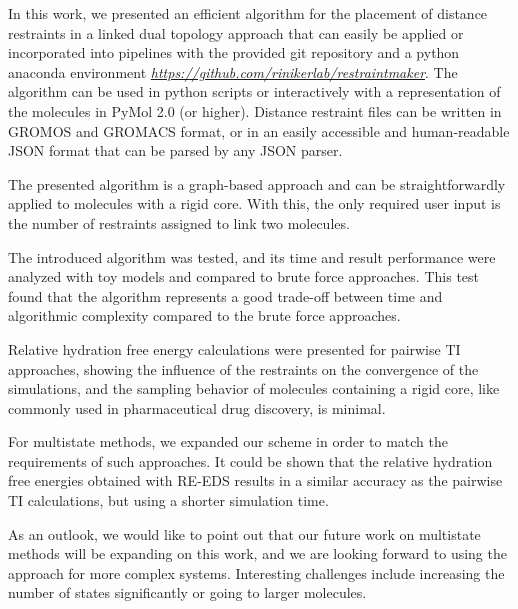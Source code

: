 In this work, we presented an efficient algorithm for the placement of distance restraints in a linked dual topology approach that can easily be applied or incorporated into pipelines with the provided git repository and a python anaconda environment \cite{anaconda} \textit{\hyperlink{https://github.com/rinikerlab/restraintmaker}{https://github.com/rinikerlab/restraintmaker}}. The algorithm can be used in python scripts or interactively with a representation of the molecules in PyMol 2.0 (or higher). Distance restraint files can be written in GROMOS and GROMACS format, or in an easily accessible and human-readable JSON format that can be parsed by any JSON parser. \cite{DeLano2020}

The presented algorithm is a graph-based approach and can be straightforwardly applied to molecules with a rigid core. With this, the only required user input is the number of restraints assigned to link two molecules.

The introduced algorithm was tested, and its time and result performance were analyzed with toy models and compared to brute force approaches. This test found that the algorithm represents a good trade-off between time and algorithmic complexity compared to the brute force approaches.

Relative hydration free energy calculations were presented for pairwise TI approaches, showing the influence of the restraints on the convergence of the simulations, and the sampling behavior of molecules containing a rigid core, like commonly used in pharmaceutical drug discovery, is minimal.

For multistate methods, we expanded our scheme in order to match the requirements of such approaches. It could be shown that the relative hydration free energies obtained with RE-EDS results in a similar accuracy as the pairwise TI calculations, but using a shorter simulation time.

As an outlook, we would like to point out that our future work on multistate methods will be expanding on this work, and we are looking forward to using the approach for more complex systems. Interesting challenges include increasing the number of states significantly or going to larger molecules.